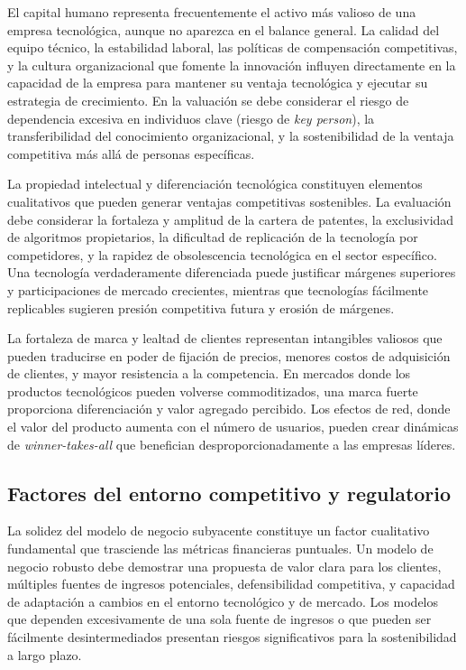 El capital humano representa frecuentemente el activo más valioso de una empresa tecnológica, aunque no aparezca en el balance general. La calidad del equipo técnico, la estabilidad laboral, las políticas de compensación competitivas, y la cultura organizacional que fomente la innovación influyen directamente en la capacidad de la empresa para mantener su ventaja tecnológica y ejecutar su estrategia de crecimiento. En la valuación se debe considerar el riesgo de dependencia excesiva en individuos clave (riesgo de \emph{key person}), la transferibilidad del conocimiento organizacional, y la sostenibilidad de la ventaja competitiva más allá de personas específicas.

La propiedad intelectual y diferenciación tecnológica constituyen elementos cualitativos que pueden generar ventajas competitivas sostenibles. La evaluación debe considerar la fortaleza y amplitud de la cartera de patentes, la exclusividad de algoritmos propietarios, la dificultad de replicación de la tecnología por competidores, y la rapidez de obsolescencia tecnológica en el sector específico. Una tecnología verdaderamente diferenciada puede justificar márgenes superiores y participaciones de mercado crecientes, mientras que tecnologías fácilmente replicables sugieren presión competitiva futura y erosión de márgenes.

La fortaleza de marca y lealtad de clientes representan intangibles valiosos que pueden traducirse en poder de fijación de precios, menores costos de adquisición de clientes, y mayor resistencia a la competencia. En mercados donde los productos tecnológicos pueden volverse commoditizados, una marca fuerte proporciona diferenciación y valor agregado percibido. Los efectos de red, donde el valor del producto aumenta con el número de usuarios, pueden crear dinámicas de \emph{winner-takes-all} que benefician desproporcionadamente a las empresas líderes.

\subsection{Factores del entorno competitivo y regulatorio}

La solidez del modelo de negocio subyacente constituye un factor cualitativo fundamental que trasciende las métricas financieras puntuales. Un modelo de negocio robusto debe demostrar una propuesta de valor clara para los clientes, múltiples fuentes de ingresos potenciales, defensibilidad competitiva, y capacidad de adaptación a cambios en el entorno tecnológico y de mercado. Los modelos que dependen excesivamente de una sola fuente de ingresos o que pueden ser fácilmente desintermediados presentan riesgos significativos para la sostenibilidad a largo plazo.

